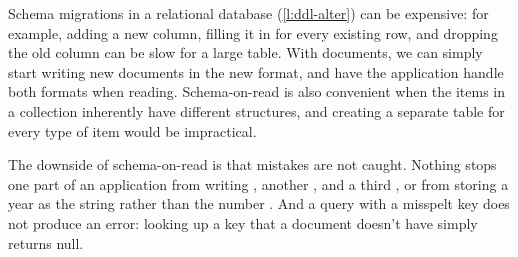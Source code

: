 Schema migrations in a relational database (\autoref{l:ddl-alter}) can be expensive: for example, adding a new column, filling it in for every existing row, and dropping the old column can be slow for a large table.
With documents, we can simply start writing new documents in the new format, and have the application handle both formats when reading.
Schema-on-read is also convenient when the items in a collection inherently have different structures, and creating a separate table for every type of item would be impractical.

The downside of schema-on-read is that mistakes are not caught.
Nothing stops one part of an application from writing , another , and a third , or from storing a year as the string  rather than the number .
And a query with a misspelt key does not produce an error: looking up a key that a document doesn't have simply returns null.

